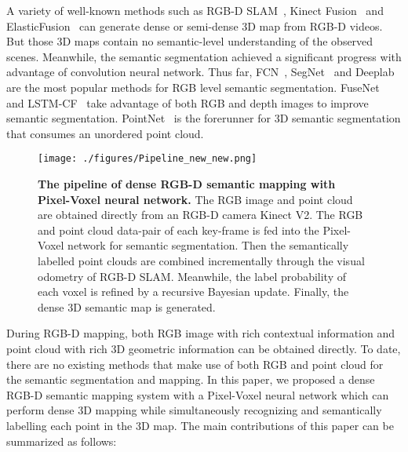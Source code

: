 \documentclass[letterpaper, 10 pt, conference]{ieeeconf}
\begin{document}
A variety of well-known methods such as RGB-D SLAM~\cite{endres20143}, Kinect Fusion~\cite{newcombe2011kinectfusion} and ElasticFusion~\cite{whelan2015elasticfusion} can generate dense or semi-dense 3D map from RGB-D videos. But those 3D maps contain no semantic-level understanding of the observed scenes. Meanwhile, the semantic segmentation achieved a significant progress with advantage of convolution neural network. Thus far, FCN~\cite{long2015fully}, SegNet~\cite{badrinarayanan2015segnet} and Deeplab~\cite{chen2016deeplab} are the most popular methods for RGB level semantic segmentation. FuseNet~\cite{hazirbas2016fusenet} and LSTM-CF~\cite{li2016lstm} take advantage of both RGB and depth images to improve semantic segmentation. PointNet~\cite{qi2016pointnet} is the forerunner for 3D semantic segmentation that consumes an unordered point cloud. 

\begin{figure}[thpb]
	\centering
	\texttt{[image: ./figures/Pipeline\_new\_new.png]}
	\caption{\textbf{The pipeline of dense RGB-D semantic mapping with Pixel-Voxel neural network.} The RGB image and point cloud are obtained directly from an RGB-D camera Kinect V2. The RGB and point cloud data-pair of each key-frame is fed into the Pixel-Voxel network for semantic segmentation. Then the semantically labelled point clouds are combined incrementally through the visual odometry of RGB-D SLAM. Meanwhile, the label probability of each voxel is refined by a recursive Bayesian update. Finally, the dense 3D semantic map is generated.}
	\label{fig:Pipeline}
\end{figure}

During RGB-D mapping, both RGB image with rich contextual information and point cloud with rich 3D geometric information can be obtained directly. To date, there are no existing methods that make use of both RGB and point cloud for the semantic segmentation and mapping. In this paper, we proposed a dense RGB-D semantic mapping system with a Pixel-Voxel neural network which can perform dense 3D mapping while simultaneously recognizing and semantically labelling each point in the 3D map. The main contributions of this paper can be summarized as follows: 
\end{document}
